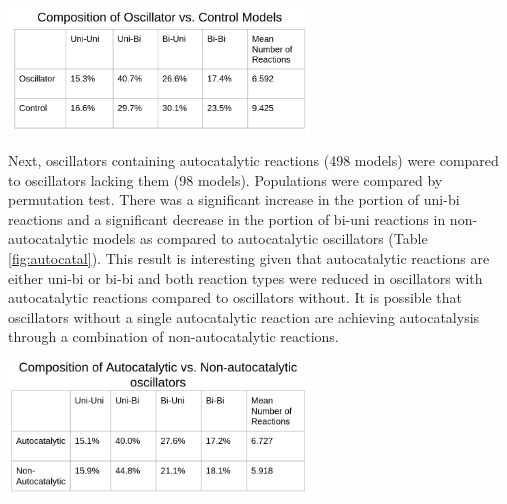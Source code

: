 \documentclass[12pt]{report}
\begin{document}
\begin{center}
    \includegraphics[width=8cm]{images/composition.png}
    \label{fig:avg-comp}
\end{center}

Next, oscillators containing autocatalytic reactions (498 models) were compared to oscillators lacking them (98 models). Populations were compared by permutation test. There was a significant increase in the portion of uni-bi reactions and a significant decrease in the portion of bi-uni reactions in non-autocatalytic models as compared to autocatalytic oscillators (Table \ref{fig:autocatal}). This result is interesting given that autocatalytic reactions are either uni-bi or bi-bi and both reaction types were reduced in oscillators with autocatalytic reactions compared to oscillators without. It is possible that oscillators without a single autocatalytic reaction are achieving autocatalysis through a combination of non-autocatalytic reactions.

\begin{center}
    \includegraphics[width=8cm]{images/autocomp.png}
    \label{fig:autocatal}
\end{center}
\end{document}
